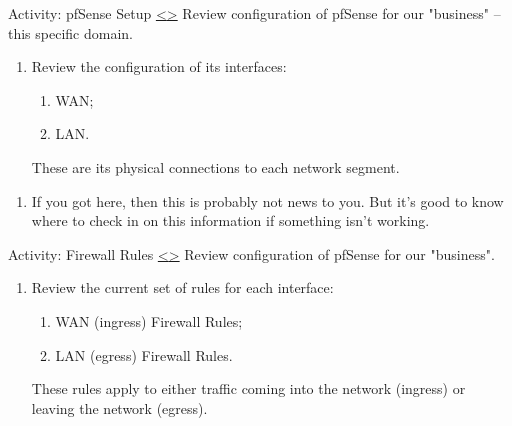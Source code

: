 \documentclass[12pt]{extarticle}
\newenvironment{instructionblock}{\Large\bgroup}{\egroup}
\begin{document}





\pagebreak
\begin{slide}{ Activity: pfSense Setup }{ \hyperref[slide 7]{\textless}\hyperref[slide 9]{\textgreater} }
\vskip 5pt
\begin{instructionblock}
Review configuration of pfSense for our "business" -- this specific domain.

\begin{enumerate}[1]
\item Review the configuration of its interfaces:
\begin{enumerate}
    \item WAN;
    \item LAN.
\end{enumerate}
These are its physical connections to each network segment.

\end{enumerate}
\end{instructionblock}
\end{slide}


\vspace{8mm}
\begin{enumerate}
\item If you got here, then this is probably not news to you. But it's good to know where to check in on this information if something isn't working.
\end{enumerate}








\pagebreak
\begin{slide}{ Activity: Firewall Rules }{ \hyperref[slide 8]{\textless}\hyperref[slide 10]{\textgreater} }
\vskip 5pt
\begin{instructionblock}
Review configuration of pfSense for our "business".

\begin{enumerate}[2]
\item Review the current set of rules for each interface:
\begin{enumerate}
    \item WAN (ingress) Firewall Rules;
    \item LAN (egress) Firewall Rules.
\end{enumerate}
These rules apply to either traffic coming into the network (ingress) or leaving the network (egress).

\end{enumerate}
\end{instructionblock}
\end{slide}
\end{document}
